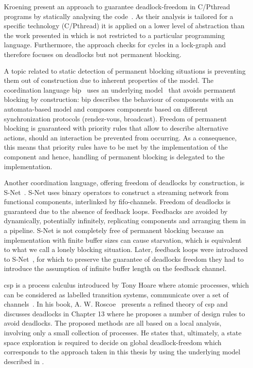 Kroening \etal present an approach to guarantee deadlock-freedom in C/Pthread programs by statically analysing the code~\cite{kroening2016}.
As their analysis is tailored for a specific technology (C/Pthread) it is applied on a lower level of abstraction than the work presented in \Chap{\ref{chap_block}} which is not restricted to a particular programming language.
Furthermore, the approach checks for cycles in a lock-graph and therefore focuses on deadlocks but not permanent blocking.

A topic related to static detection of permanent blocking situations is preventing them out of construction due to inherent properties of the model.
The coordination language \gls{bip}~\cite{basu2006} uses an underlying model~\cite{gossler2002} that avoids permanent blocking by construction:
\Gls{bip} describes the behaviour of components with an automata-based model and composes components based on different synchronization protocols (\eg rendez-vous, broadcast).
Freedom of permanent blocking is guaranteed with priority rules that allow to describe alternative actions, should an interaction be prevented from occurring.
As a consequence, this means that priority rules have to be met by the implementation of the component and hence, handling of permanent blocking is delegated to the implementation.

Another coordination language, offering freedom of deadlocks by construction, is S-Net~\cite{grelck2010}.
\mbox{S-Net} uses binary operators to construct a streaming network from functional components, interlinked by \gls{fifo}-channels.
Freedom of deadlocks is guaranteed due to the absence of feedback loops.
Feedbacks are avoided by dynamically, potentially infinitely, replicating components and arranging them in a pipeline.
S-Net is not completely free of permanent blocking because an implementation with finite buffer sizes can cause starvation, which is equivalent to what we call a lonely blocking situation.
Later, feedback loops were introduced to S-Net~\cite{grelck2013}, for which to preserve the guarantee of deadlocks freedom they had to introduce the assumption of infinite buffer length on the feedback channel.

\Gls{csp} is a process calculus introduced by Tony Hoare where atomic processes, which can be considered as labelled transition systems, communicate over a set of channels~\cite{hoare1978}.
In his book, A. W. Roscoe~\cite{roscoe1997} presents a refined theory of \gls{csp} and discusses deadlocks in Chapter 13 where he proposes a number of design rules to avoid deadlocks.
The proposed methods are all based on a local analysis, involving only a small collection of processes.
He states that, ultimately, a state space exploration is required to decide on global deadlock-freedom which corresponds to the approach taken in this thesis by using the underlying model described in \Chap{\ref{chap_block}}.

